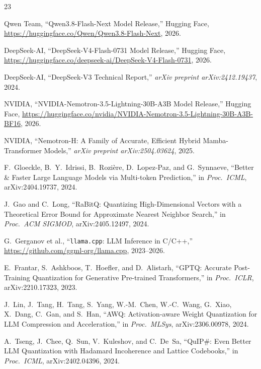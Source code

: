 \documentclass[10pt,twocolumn]{article}
\begin{document}
\raggedbottom
{\small
\begin{thebibliography}{23}
\setlength{\itemsep}{1.5pt}
\setlength{\parskip}{0pt}

Qwen Team, ``Qwen3.8-Flash-Next Model Release,'' Hugging Face, \url{https://huggingface.co/Qwen/Qwen3.8-Flash-Next}, 2026.

DeepSeek-AI, ``DeepSeek-V4-Flash-0731 Model Release,'' Hugging Face, \url{https://huggingface.co/deepseek-ai/DeepSeek-V4-Flash-0731}, 2026.

DeepSeek-AI, ``DeepSeek-V3 Technical Report,'' \emph{arXiv preprint arXiv:2412.19437}, 2024.

NVIDIA, ``NVIDIA-Nemotron-3.5-Lightning-30B-A3B Model Release,'' Hugging Face, \url{https://huggingface.co/nvidia/NVIDIA-Nemotron-3.5-Lightning-30B-A3B-BF16}, 2026.

NVIDIA, ``Nemotron-H: A Family of Accurate, Efficient Hybrid Mamba-Transformer Models,'' \emph{arXiv preprint arXiv:2504.03624}, 2025.

F.~Gloeckle, B.~Y.~Idrissi, B.~Rozi\`ere, D.~Lopez-Paz, and G.~Synnaeve, ``Better \& Faster Large Language Models via Multi-token Prediction,'' in \emph{Proc.\ ICML}, arXiv:2404.19737, 2024.

J.~Gao and C.~Long, ``RaBitQ: Quantizing High-Dimensional Vectors with a Theoretical Error Bound for Approximate Nearest Neighbor Search,'' in \emph{Proc.\ ACM SIGMOD}, arXiv:2405.12497, 2024.

G.~Gerganov et al., ``\texttt{llama.cpp}: LLM Inference in C/C++,'' \url{https://github.com/ggml-org/llama.cpp}, 2023--2026.

E.~Frantar, S.~Ashkboos, T.~Hoefler, and D.~Alistarh, ``GPTQ: Accurate Post-Training Quantization for Generative Pre-trained Transformers,'' in \emph{Proc.\ ICLR}, arXiv:2210.17323, 2023.

J.~Lin, J.~Tang, H.~Tang, S.~Yang, W.-M.~Chen, W.-C.~Wang, G.~Xiao, X.~Dang, C.~Gan, and S.~Han, ``AWQ: Activation-aware Weight Quantization for LLM Compression and Acceleration,'' in \emph{Proc.\ MLSys}, arXiv:2306.00978, 2024.

A.~Tseng, J.~Chee, Q.~Sun, V.~Kuleshov, and C.~De~Sa, ``QuIP\#: Even Better LLM Quantization with Hadamard Incoherence and Lattice Codebooks,'' in \emph{Proc.\ ICML}, arXiv:2402.04396, 2024.


\end{thebibliography}}
\end{document}
